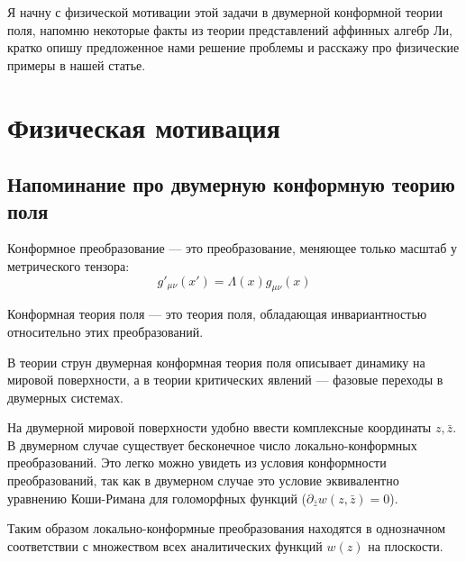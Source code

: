 \documentclass[a4paper,12pt]{article}
\theoremstyle{definition} \newtheorem{Def}{Definition}
\begin{document}
Я начну с физической мотивации этой задачи в двумерной конформной теории поля, напомню некоторые
факты из теории представлений аффинных алгебр Ли, кратко опишу предложенное нами решение проблемы и
расскажу про физические примеры в нашей статье.

\section{Физическая мотивация}
\label{sec:physics}

\subsection{Напоминание про двумерную конформную теорию поля}
\label{sec:CFT}

Конформное преобразование --- это преобразование, меняющее только масштаб у метрического тензора:
\begin{equation}
  \label{eq:10}
  g'_{\mu\nu}(x')=\Lambda(x)g_{\mu\nu}(x)
\end{equation}

Конформная теория поля --- это теория поля, обладающая инвариантностью относительно этих преобразований.

В теории струн двумерная конформная теория поля описывает динамику на мировой поверхности, а в
теории критических явлений --- фазовые переходы в двумерных системах.

На двумерной мировой поверхности удобно ввести комплексные координаты $z,\bar{z}$. 
В двумерном случае существует бесконечное число локально-конформных преобразований.
Это легко можно увидеть из условия конформности преобразований, так как в двумерном случае это
условие эквивалентно уравнению Коши-Римана для голоморфных функций ($\partial_{\bar z}w(z,\bar
z)=0$).

Таким образом локально-конформные преобразования находятся в однозначном соответствии с множеством
всех аналитических функций $w(z)$ на плоскости.  
\end{document}

